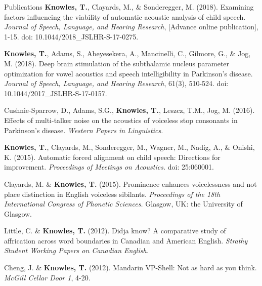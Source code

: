 \documentclass{resume} %
\begin{document}


\begin{rSection}{Publications}
	{\bf Knowles, T.}, Clayards, M., \& Sonderegger, M. (2018). Examining factors influencing the viability of automatic acoustic analysis of child speech. \emph{Journal of Speech, Language, and Hearing Research}, [Advance online publication], 1-15. doi: 10.1044/2018\_JSLHR-S-17-0275.

{\bf Knowles, T.}, Adams, S., Abeyesekera, A., Mancinelli, C., Gilmore, G., \& Jog, M. (2018). Deep brain stimulation of the subthalamic nucleus parameter optimization for vowel acoustics and speech intelligibility in Parkinson's disease. \emph{Journal of Speech, Language, and Hearing Research}, 61(3), 510-524. doi: 10.1044/2017\_JSLHR-S-17-0157.

Cushnie-Sparrow, D., Adams, S.G., {\bf Knowles, T.}, Leszcz, T.M., Jog, M. (2016). Effects of multi-talker noise on the acoustics of voiceless stop consonants in Parkinson's disease. \emph{Western Papers in Linguistics.}

{\bf Knowles, T.}, Clayards, M., Sonderegger, M., Wagner, M., Nadig, A., \& Onishi, K. (2015). Automatic forced alignment on child speech: Directions for improvement. \emph{Proceedings of Meetings on Acoustics.} doi: 25:060001.

Clayards, M. \& {\bf Knowles, T.} (2015). Prominence enhances voicelessness and not place distinction in English voiceless sibilants. \emph{Proceedings of the 18th International Congress of Phonetic Sciences.} Glasgow, UK: the University of Glasgow.

Little, C. \& {\bf Knowles, T.} (2012). Didja know? A comparative study of affrication across word boundaries in Canadian and American English. \emph{Strathy Student Working Papers on Canadian English.}

Cheng, J. \& {\bf Knowles, T.} (2012). Mandarin VP-Shell: Not as hard as you think. \emph{McGill Cellar Door 1}, 4-20.

\end{rSection}

\end{document}
